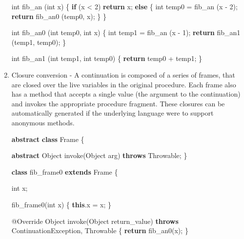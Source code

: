 \documentclass[12pt,a4paper,oneside,openright]{book}
\newenvironment{Shaded}{\begin{snugshade}}{\end{snugshade}}
\newcommand{\KeywordTok}[1]{\textcolor[rgb]{0.13,0.29,0.53}{\textbf{{#1}}}}
\newcommand{\DataTypeTok}[1]{\textcolor[rgb]{0.13,0.29,0.53}{{#1}}}
\newcommand{\DecValTok}[1]{\textcolor[rgb]{0.00,0.00,0.81}{{#1}}}
\newcommand{\FunctionTok}[1]{\textcolor[rgb]{0.00,0.00,0.00}{{#1}}}
\newcommand{\NormalTok}[1]{{#1}}
\begin{document}
\begin{enumerate}
\begin{Shaded}
\begin{Highlighting}[]
\DataTypeTok{int} \FunctionTok{fib_an} \NormalTok{(}\DataTypeTok{int} \NormalTok{x) \{}
    \KeywordTok{if} \NormalTok{(x < }\DecValTok{2}\NormalTok{)}
        \KeywordTok{return} \NormalTok{x;}
    \KeywordTok{else} \NormalTok{\{}
        \DataTypeTok{int} \NormalTok{temp0 = }\FunctionTok{fib_an} \NormalTok{(x - }\DecValTok{2}\NormalTok{);}
        \KeywordTok{return} \FunctionTok{fib_an0} \NormalTok{(temp0, x);}
    \NormalTok{\}}
\NormalTok{\}}

\DataTypeTok{int} \FunctionTok{fib_an0} \NormalTok{(}\DataTypeTok{int} \NormalTok{temp0, }\DataTypeTok{int} \NormalTok{x) \{}
    \DataTypeTok{int} \NormalTok{temp1 = }\FunctionTok{fib_an} \NormalTok{(x - }\DecValTok{1}\NormalTok{);}
    \KeywordTok{return} \FunctionTok{fib_an1} \NormalTok{(temp1, temp0);}
\NormalTok{\}}

\DataTypeTok{int} \FunctionTok{fib_an1} \NormalTok{(}\DataTypeTok{int} \NormalTok{temp1, }\DataTypeTok{int} \NormalTok{temp0) \{}
    \KeywordTok{return} \NormalTok{temp0 + temp1;}
\NormalTok{\}}
\end{Highlighting}
\end{Shaded}
\item
  Closure conversion - A continuation is composed of a series of frames,
  that are closed over the live variables in the original procedure.
  Each frame also has a method that accepts a single value (the argument
  to the continuation) and invokes the appropriate procedure fragment.
  These closures can be automatically generated if the underlying
  language were to support anonymous methods.

\begin{Shaded}
\begin{Highlighting}[]
\KeywordTok{abstract} \KeywordTok{class} \NormalTok{Frame \{}

    \KeywordTok{abstract} \NormalTok{Object }\FunctionTok{invoke}\NormalTok{(Object arg)}
        \KeywordTok{throws} \NormalTok{Throwable;}
\NormalTok{\}}

\KeywordTok{class} \NormalTok{fib_frame0 }\KeywordTok{extends} \NormalTok{Frame \{}

    \DataTypeTok{int} \NormalTok{x;}

    \FunctionTok{fib_frame0}\NormalTok{(}\DataTypeTok{int} \NormalTok{x) \{}
        \KeywordTok{this}\NormalTok{.}\FunctionTok{x} \NormalTok{= x;}
    \NormalTok{\}}

    \FunctionTok{@Override}
    \NormalTok{Object }\FunctionTok{invoke}\NormalTok{(Object return_value)}
        \KeywordTok{throws} \NormalTok{ContinuationException, Throwable \{}
        \KeywordTok{return} \FunctionTok{fib_an0}\NormalTok{(x);}
    \NormalTok{\}}


\end{Highlighting}
\end{Shaded}
\end{enumerate}
\end{document}
